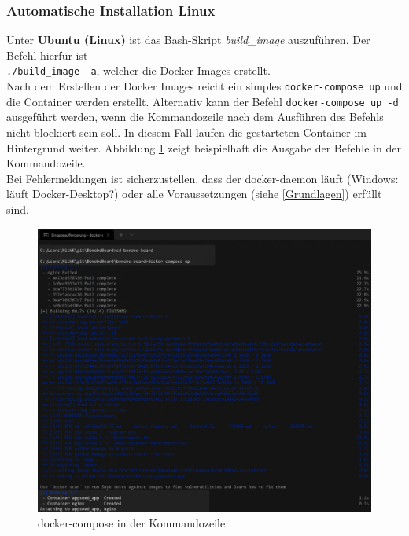 \documentclass[a4paper,11pt]{scrartcl}
\begin{document}
\subsubsection*{Automatische Installation Linux}
Unter \textbf{Ubuntu (Linux)} ist das Bash-Skript \textit{build\_image} auszuführen.
Der Befehl hierfür ist\\
\texttt{./build\_image -a}, welcher die Docker Images erstellt.\\

\noindent Nach dem Erstellen der Docker Images reicht ein simples \texttt{docker-compose up} und
die Container werden erstellt. Alternativ kann der Befehl \texttt{docker-compose up -d} ausgeführt werden,
wenn die Kommandozeile nach dem Ausführen des Befehls nicht blockiert sein soll.
In diesem Fall laufen die gestarteten Container im Hintergrund weiter.
Abbildung \ref{img:docker-compose} zeigt beispielhaft die Ausgabe der Befehle in der Kommandozeile.\\ 
Bei Fehlermeldungen ist sicherzustellen, dass der docker-daemon läuft (Windows: läuft Docker-Desktop?) oder alle Voraussetzungen (siehe \ref{Grundlagen}) erfüllt sind.
\begin{figure}[H]
\begin{center}
\includegraphics[width=0.8\linewidth]{docker-compose}
\caption{docker-compose in der Kommandozeile}
\label{img:docker-compose}
\end{center}
\end{figure}
\end{document}

